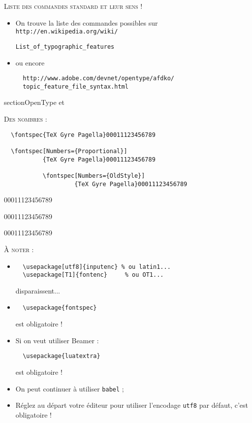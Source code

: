 \documentclass[12pt,a4paper,twocolumn]{book} %
\begin{document}
{		                          {\textsc{Liste des commandes standard et leur sens !}}

			                  \begin{itemize}
				          \item On trouve la liste des commandes possibles sur \verb=http://en.wikipedia.org/wiki/=

				            \qquad\qquad\qquad\verb=List_of_typographic_features=
				          \item ou encore \begin{verbatim}
  http://www.adobe.com/devnet/opentype/afdko/
  topic_feature_file_syntax.html
\end{verbatim}
			                  \end{itemize}


	                                  section{OpenType et \LuaLaTeX}


	                                  {\textsc{Des nombres :}}
\begin{verbatim}
  \fontspec{TeX Gyre Pagella}00011123456789

  \fontspec[Numbers={Proportional}]
           {TeX Gyre Pagella}00011123456789

           \fontspec[Numbers={OldStyle}]
                    {TeX Gyre Pagella}00011123456789
\end{verbatim}


00011123456789

00011123456789

         00011123456789





                  {\textsc{À noter :}}
                  \begin{itemize}
                  \item	\begin{verbatim}
  \usepackage[utf8]{inputenc} % ou latin1...
  \usepackage[T1]{fontenc}     % ou OT1...
\end{verbatim}
  disparaissent...
\item	\begin{verbatim}
  \usepackage{fontspec}
\end{verbatim}
  est obligatoire !
\item	Si on veut utiliser Beamer :
\begin{verbatim}
  \usepackage{luatextra}
\end{verbatim}
est obligatoire !
\item	On peut continuer à utiliser \texttt{babel} ;
\item	Réglez au départ votre éditeur pour utiliser l'encodage \texttt{utf8} par défaut, c'est obligatoire !
                  \end{itemize}


}
\end{document}
